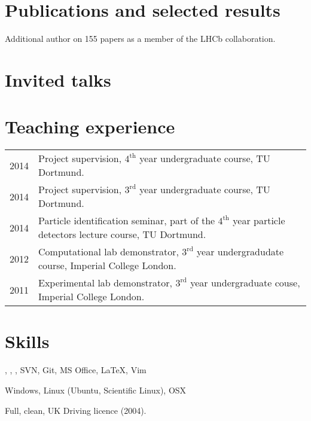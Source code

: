 \documentclass[10pt]{article}
\renewenvironment{compactitem}{
  \begin{list}{}{
    \setlength{\leftmargin}{1em}
    \setlength{\pltopsep}{\smallskipamount}
    \setlength{\plitemsep}{0.1pt}
\setlength{\plparsep}{0.1pt}
  }
}{
  \end{list}
}
\begin{document}
\section*{Publications and selected results} 
\begin{compactitem}
\item {}
\item {}
\item {}
\item {}
\item {}
\item Additional author on 155 papers as a member of the LHCb collaboration.
\end{compactitem}	


\section*{Invited talks} 
\begin{compactitem}
\item {}
\item {}
\item {}
\item {}
\item {}
\item {}
\item {}
\end{compactitem}

\section*{Teaching experience}
\begin{tabular}{ll}
    2014 & Project supervision, $4^{\text{th}}$ year undergraduate course, TU Dortmund. \\
    2014 & Project supervision, $3^{\text{rd}}$ year undergraduate course, TU Dortmund. \\
    2014 & Particle identification seminar, part of the $4^{\text{th}}$ year particle detectors lecture course, TU Dortmund. \\
    2012 & Computational lab demonstrator, $3^{\text{rd}}$ year undergradudate course, Imperial College London. \\
    2011 & Experimental lab demonstrator, $3^{\text{rd}}$ year undergraduate couse, Imperial College London.
\end{tabular}

\section*{Skills}
\begin{compactitem}
    \item \cpp, \python, \fortran, SVN, Git, MS Office, \LaTeX, Vim
    \item Windows, Linux (Ubuntu, Scientific Linux), OSX
    \item Full, clean, UK Driving licence (2004).
\end{compactitem}

\end{document}
